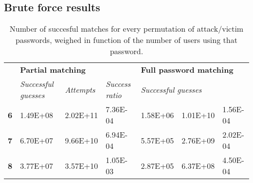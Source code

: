 \documentclass[british,11pt,a4paper]{article}
\begin{document}
\begin{appendices}
	\section{Brute force results}\label{app:bruteforceresults}
	\begin{table}[h]
	\centering
	\begin{tabular}{l|l|l|l|l|l|l|}
	\cline{2-7}
	 & \multicolumn{3}{l|}{\textbf{Partial matching}} & \multicolumn{3}{l|}{\textbf{Full password matching}} \\ \cline{2-7} 
	 & \textit{Successful guesses} & \textit{Attempts} & \textit{Success ratio} & \multicolumn{3}{l|}{\textit{Successful guesses}} \\ \hline
	\multicolumn{1}{|l|}{\textbf{6}} & 1.49E+08 & 2.02E+11 & 7.36E-04 & 1.58E+06 & 1.01E+10 & 1.56E-04 \\ \hline
	\multicolumn{1}{|l|}{\textbf{7}} & 6.70E+07 & 9.66E+10 & 6.94E-04 & 5.57E+05 & 2.76E+09 & 2.02E-04 \\ \hline
	\multicolumn{1}{|l|}{\textbf{8}} & 3.77E+07 & 3.57E+10 & 1.05E-03 & 2.87E+05 & 6.37E+08 & 4.50E-04 \\ \hline
	\end{tabular}
	\caption{Number of succesful matches for every permutation of attack/victim passwords, weighed in function of the number of users using that password.}
	\label{tab:brute_force}
	\end{table}

\end{appendices}
\clearpage
\end{document}

